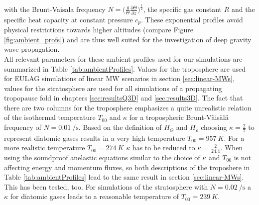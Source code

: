 with the Brunt-Vaisala frequency $N=\bigl(\frac{g}{\Theta}\frac{\partial \bar{\Theta}}{\partial z}\bigr)^{\frac{1}{2}}$, the specific gas constant $R$ and the specific heat capacity at constant pressure $c_p$. These exponential profiles avoid physical restrictions towards higher altitudes (compare Figure \ref{fig:ambient_profs}) and are thus well suited for the investigation of deep gravity wave propagation. \\
All relevant parameters for these ambient profiles used for our simulations are summarized in Table \ref{tab:ambientProfiles}. Values for the troposphere are used for EULAG simulations of linear MW scenarios in section \ref{sec:linear-MWs}, values for the stratosphere are used for all simulations of a propagating tropopause fold in chapters \ref{sec:resultsQ3D} and \ref{sec:results3D}. The fact that there are two columns for the troposphere emphasizes a quite unrealistic relation of the isothermal temperature $T_{00}$ and $\kappa$ for a tropospheric Brunt-Väisälä frequency of $N=\SI{0.01}{\per\second}$. Based on the definition of $H_{\Theta}$ and $H_{\rho}$ choosing $\kappa=\frac{2}{7}$ to represent diatomic gases results in a very high temperature $T_{00} = \SI{957}{K}$. For a more realistic temperature $T_{00} = \SI{274}{K}$ $\kappa$ has to be reduced to $\kappa=\frac{2}{24.4}$. When using the soundproof anelastic equations similar to \textcite[]{lipps_scale_1982} the choice of $\kappa$ and $T_{00}$ is not affecting energy and momentum fluxes, so both descriptions of the troposhere in Table \ref{tab:ambientProfiles} lead to the same result in section \ref{sec:linear-MWs}. This has been tested, too. For simulations of the stratosphere with $N=\SI{0.02}{\per\second}$ a $\kappa$ for diatomic gases leads to a reasonable temperature of $T_{00} = \SI{239}{K}$.
